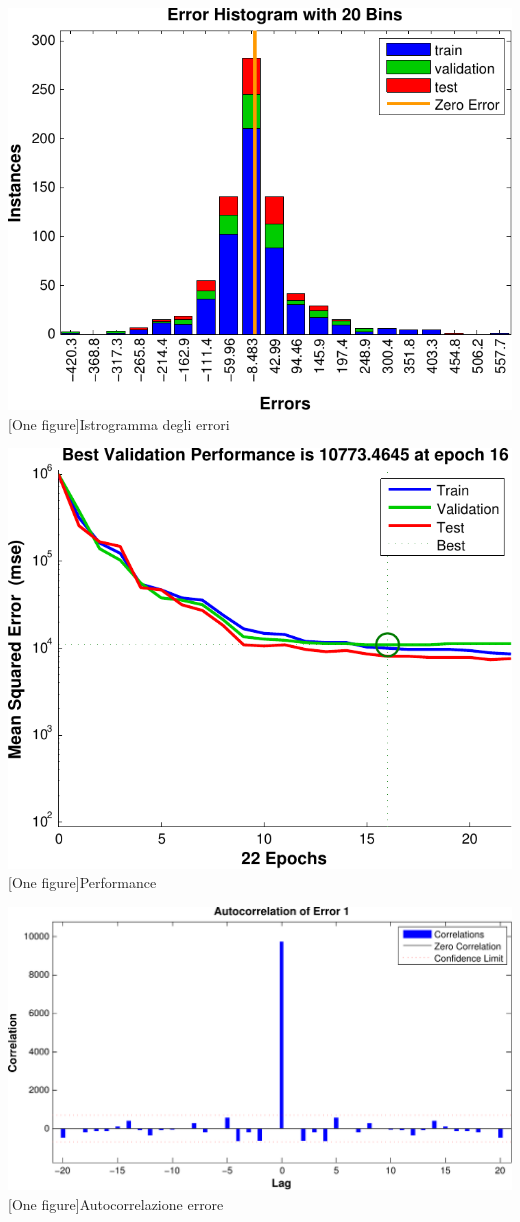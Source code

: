 \includegraphics[scale=0.5]{images/timeseries/inlight/histogram.pdf}
[One figure]{Istrogramma degli errori}
\vspace{20px}

\includegraphics[scale=0.5]{images/timeseries/inlight/performances.pdf}
[One figure]{Performance}
\vspace{20px}

\includegraphics[scale=0.5]{images/timeseries/inlight/autocorrelations.pdf}
[One figure]{Autocorrelazione errore}
\vspace{20px}

